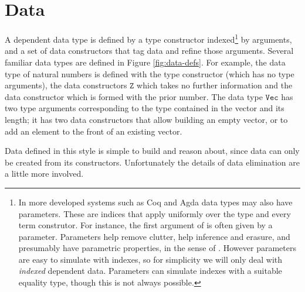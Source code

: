 \section{Data}


A dependent data type is defined by a type constructor indexed\footnote{
 In more developed systems such as Coq and Agda data types may also have parameters.
 These are indices that apply uniformly over the type and every term construtor.
 For instance, the first argument of \Vect{} is often given by a parameter.
 Parameters help remove clutter, help inference and erasure, and presumably have parametric properties, in the sense of \cite{10.1145/99370.99404}.
 However parameters are easy to simulate with indexes, so for simplicity we will only deal with \emph{indexed} dependent data.
 Parameters can simulate indexes with a suitable equality type\cite{sjoberg2012irrelevance}, though this is not always possible\cite[Section 8]{10.1145/3495528}.
} by arguments, and a set of data constructors that tag data and refine those arguments.
Several familiar data types are defined in Figure \ref{fig:data-defs}.
For example, the data type of natural numbers is defined with the type constructor \Nat{} (which has no type arguments), the data constructors $\mathtt{Z}$ which takes no further information and the data constructor \Suc which is formed with the prior number.
The data type $\mathtt{Vec}$ has two type arguments corresponding to the type contained in the vector and its length; it has two data constructors that allow building an empty vector, or to add an element to the front of an existing vector.

Data defined in this style is simple to build and reason about, since data can only be created from its constructors.
Unfortunately the details of data elimination are a little more involved.

